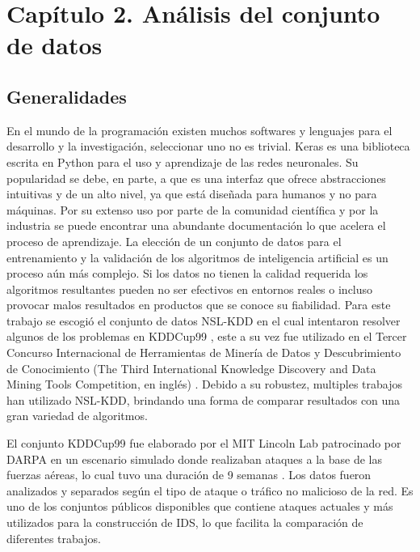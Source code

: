 \chapter*{Capítulo 2. Análisis del conjunto de datos}\label{chapter:dataset}

\section{Generalidades}
En el mundo de la programación existen muchos softwares y lenguajes para el desarrollo y la investigación, seleccionar uno no es trivial. Keras \cite{gulli2017deep} es una biblioteca escrita en Python \cite{lutz2001programming} para el uso y aprendizaje de las redes neuronales. Su popularidad se debe, en parte, a que es una interfaz que ofrece abstracciones intuitivas y de un alto nivel, ya que está diseñada para humanos y no para máquinas. Por su extenso uso por parte de la comunidad científica y por la industria se puede encontrar una abundante documentación lo que acelera el proceso de aprendizaje. La elección de un conjunto de datos para el entrenamiento y la validación de los algoritmos de inteligencia artificial es un proceso aún más complejo. Si los datos no tienen la calidad requerida los algoritmos resultantes pueden no ser efectivos en entornos reales o incluso provocar malos resultados en productos que se conoce su fiabilidad. Para este trabajo se escogió el conjunto de datos NSL-KDD \cite{dhanabal2015study} en el cual intentaron resolver algunos de los problemas en KDDCup99 \cite{tavallaee2009detailed}, este a su vez fue utilizado en el Tercer Concurso Internacional de Herramientas de Minería de Datos y Descubrimiento de Conocimiento (The Third International Knowledge Discovery and Data Mining Tools Competition, en inglés) \cite{stolfocost}. Debido a su robustez, multiples trabajos han utilizado NSL-KDD, brindando una forma de comparar resultados con una gran variedad de algoritmos.

El conjunto KDDCup99 fue elaborado por el MIT Lincoln Lab patrocinado por DARPA en un escenario simulado donde realizaban ataques a la base de las fuerzas aéreas, lo cual tuvo una duración de 9 semanas \cite{mchugh2000testing}. Los datos fueron analizados y separados según el tipo de ataque o tráfico no malicioso de la red. Es uno de los conjuntos públicos disponibles que contiene ataques actuales y más utilizados para la construcción de IDS, lo que facilita la comparación de diferentes trabajos.

